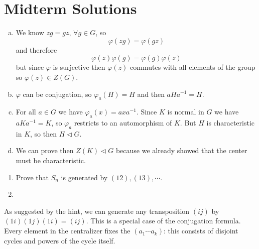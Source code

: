 \section{Midterm Solutions}

\begin{Problem}
\end{Problem}

\begin{Answer}
\begin{enumerate}[(a)]
  \item{
    We know $zg = gz$, $\forall g \in G$, so
    $$
    \varphi(z g) = \varphi(g z)
    $$
    and therefore
    $$
    \varphi(z)\varphi(g) = \varphi(g) \varphi(z)
    $$
    but since $\varphi$ is surjective then
    $\varphi(z)$ commutes with all elements of the group so
    $\varphi(z) \in Z(G)$.
  }
  \item{
    $\varphi$ can be conjugation, so $\varphi_a(H) = H$
    and then $a H a^{-1} = H$.
  }
  \item{
    For all $a \in G$ we have $\varphi_a(x) = a x a^{-1}$. Since $K$
    is normal in $G$ we have $a K a^{-1} = K$, so $\varphi_a$
    restricts to an automorphism of $K$. But $H$ is characteristic in
    $K$, so then $H \triangleleft G$.
  }
  \item{
    We can prove then $Z(K) \triangleleft G$ because we already showed
    that the center must be characteristic.
  }
\end{enumerate}
\end{Answer}

\begin{Problem}
\begin{enumerate}
  \item{
    Prove that $S_n$ is generated by $(12),(13),\cdots$.
  }
  \item{
  }
\end{enumerate}
\end{Problem}

\begin{Answer}
As suggested by the hint, we can generate any transposition $(ij)$ by
$(1i)(1j)(1i) = (ij)$. This is a special case of the conjugation
formula. Every element in the centralizer fixes the $(a_1 \cdots
a_k)$: this consists of disjoint cycles and powers of the cycle itself.
\end{Answer}

